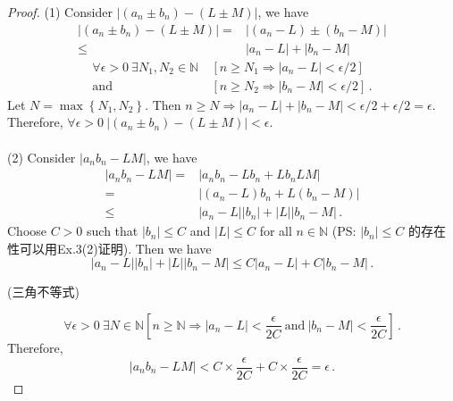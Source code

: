 \documentclass{book}
\theoremstyle{definition}
\begin{document}
\begin{proof}
(1) Consider $\left| (a_n \pm b_n) - (L\pm M) \right|$, we have 
\begin{equation}
\begin{aligned}
    \left| (a_n \pm b_n) - (L\pm M) \right| {=}& \left| (a_n - L) \pm (b_n- M) \right| \\
                                          {\leq}& \left| a_n - L\right| + \left| b_n - M\right|
\end{aligned}
\end{equation}
\begin{equation}
\begin{aligned}
    \forall \epsilon>0~\exists N_1, N_2 \in \mathbb{N}~&[n \geq N_1 \Rightarrow |a_n-L|<\epsilon/2]\\
    \text{and}~&[n\geq N_2 \Rightarrow |b_n-M|<\epsilon/2] \,.
\end{aligned}
\end{equation}
Let $N=\max\left\{N_1, N_2\right\}$. Then $n \geq N \Rightarrow \left| a_n - L\right| + \left| b_n - M\right| < \epsilon/2+\epsilon/2=\epsilon$.\\
Therefore, $\forall \epsilon>0 ~ \left| (a_n \pm b_n) - (L\pm M) \right|<\epsilon$. \\
~\\
\noindent (2) Consider $\left| a_n b_n - LM \right|$, we have
\begin{equation}
    \begin{aligned}
        \left| a_n b_n - LM \right|{=}& \left| a_n b_n -L b_n + L b_n LM \right|\\
                                   {=}& \left| (a_n - L) b_n + L(b_n - M)\right|\\
                                   {\leq}& \left| a_n-L\right||b_n|+|L||b_n-M| \,.
    \end{aligned}
\end{equation}
Choose $C>0$ such that $|b_n| \leq C$ and $|L|\leq C$ for all $n\in \mathbb{N}$ (PS: $|b_n| \leq C$ 的存在性可以用Ex.3(2)证明). Then we have
\begin{equation}
        \left| a_n-L\right||b_n|+|L|\left|b_n-M\right| \leq C\left|a_n-L \right| + C\left|b_n-M\right| \,.
\end{equation}
\begin{flushright}(三角不等式)\end{flushright}
\begin{equation}
    \forall \epsilon>0~\exists N\in \mathbb{N} \left[ n\geq\mathbb{N} \Rightarrow \left|a_n-L\right|<\frac{\epsilon}{2C}~\text{and}~ \left|b_n-M\right|<\frac{\epsilon}{2C} \right] \,.
\end{equation}
Therefore,
\begin{equation}
    \left| a_n b_n - LM \right|<C\times\frac{\epsilon}{2C}+C\times\frac{\epsilon}{2C}=\epsilon \,.
\end{equation}
\end{proof}
\end{document}

